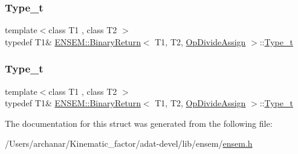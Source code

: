 \mbox{\label{structENSEM_1_1BinaryReturn_3_01T1_00_01T2_00_01OpDivideAssign_01_4_a02fea7e2c56cca02f54cf841a28052d3}} 
\subsubsection{\texorpdfstring{Type\_t}{Type\_t}\hspace{0.1cm}{\footnotesize\ttfamily [2/3]}}
{\footnotesize\ttfamily template$<$class T1 , class T2 $>$ \\
typedef T1\& \mbox{\hyperlink{structENSEM_1_1BinaryReturn}{E\+N\+S\+E\+M\+::\+Binary\+Return}}$<$ T1, T2, \mbox{\hyperlink{structENSEM_1_1OpDivideAssign}{Op\+Divide\+Assign}} $>$\+::\mbox{\hyperlink{structENSEM_1_1BinaryReturn_3_01T1_00_01T2_00_01OpDivideAssign_01_4_a02fea7e2c56cca02f54cf841a28052d3}{Type\+\_\+t}}}

\mbox{\label{structENSEM_1_1BinaryReturn_3_01T1_00_01T2_00_01OpDivideAssign_01_4_a02fea7e2c56cca02f54cf841a28052d3}} 
\subsubsection{\texorpdfstring{Type\_t}{Type\_t}\hspace{0.1cm}{\footnotesize\ttfamily [3/3]}}
{\footnotesize\ttfamily template$<$class T1 , class T2 $>$ \\
typedef T1\& \mbox{\hyperlink{structENSEM_1_1BinaryReturn}{E\+N\+S\+E\+M\+::\+Binary\+Return}}$<$ T1, T2, \mbox{\hyperlink{structENSEM_1_1OpDivideAssign}{Op\+Divide\+Assign}} $>$\+::\mbox{\hyperlink{structENSEM_1_1BinaryReturn_3_01T1_00_01T2_00_01OpDivideAssign_01_4_a02fea7e2c56cca02f54cf841a28052d3}{Type\+\_\+t}}}



The documentation for this struct was generated from the following file\+:\begin{DoxyCompactItemize}
\item 
/\+Users/archanar/\+Kinematic\+\_\+factor/adat-\/devel/lib/ensem/\mbox{\hyperlink{adat-devel_2lib_2ensem_2ensem_8h}{ensem.\+h}}\end{DoxyCompactItemize}
